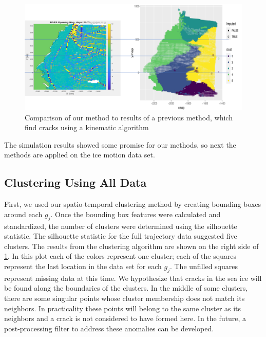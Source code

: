 \documentclass[12pt]{article}
\begin{document}
\begin{figure}[tbp]

{\centering \includegraphics[width=1\linewidth,]{images/all_weeks_comp_correct} 

}

\caption{Comparison of our method to results of a previous method, which find cracks using a kinematic algorithm}\label{fig:all-week-comp}
\end{figure}

The simulation results showed some promise for our methods, so next the
methods are applied on the ice motion data set.

\hypertarget{clustering-using-all-data}{%
\subsection{Clustering Using All Data}\label{clustering-using-all-data}}

First, we used our spatio-temporal clustering method by creating
bounding boxes around each \(g_j\). Once the bounding box features were
calculated and standardized, the number of clusters were determined
using the silhouette statistic. The silhouette statistic for the full
trajectory data suggested five clusters. The results from the clustering
algorithm are shown on the right side of \cref{fig:all-week-comp}. In
this plot each of the colors represent one cluster; each of the squares
represent the last location in the data set for each \(g_j\). The
unfilled squares represent missing data at this time. We hypothesize
that cracks in the sea ice will be found along the boundaries of the
clusters. In the middle of some clusters, there are some singular points
whose cluster membership does not match its neighbors. In practicality
these points will belong to the same cluster as its neighbors and a
crack is not considered to have formed here. In the future, a
post-processing filter to address these anomalies can be developed.
\end{document}
